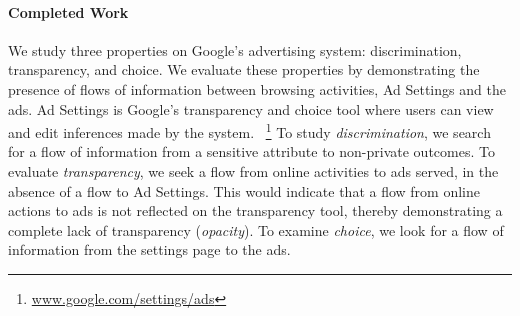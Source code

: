 \documentclass[10pt, onecolumn]{report}
\begin{document}



\paragraph{Completed Work}
We study three properties on Google's advertising system: 
discrimination, transparency, and choice. We evaluate these properties by 
demonstrating the presence of flows of information between browsing activities, 
Ad Settings and the ads. Ad Settings is Google's transparency and choice 
tool where users can view and edit inferences made by the system.
~\footnote{\url{www.google.com/settings/ads}}
To study \emph{discrimination}, we search for a flow of 
information from a sensitive attribute to non-private outcomes. 
To evaluate \emph{transparency}, 
we seek a flow from online activities to ads served, in the absence of a flow to Ad Settings. 
This would indicate that a flow from online actions to ads is not reflected on the 
transparency tool, thereby demonstrating a complete lack of transparency 
(\emph{opacity}). 
To examine \emph{choice}, we look for a flow of information 
from the settings page to the ads.
\end{document}
